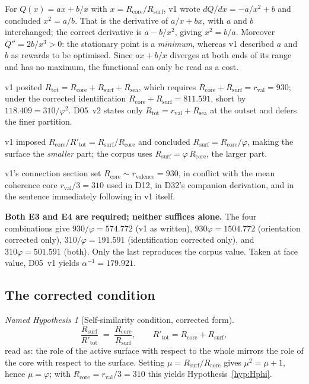 \documentclass[11pt,a4paper]{article}
\newcommand{\Rsea}{R_{\mathrm{sea}}}
\theoremstyle{plain}
\theoremstyle{definition}
\theoremstyle{remark}
\newtheorem{namedhyp}[theorem]{Named Hypothesis}
\newcommand{\rval}{r_{\mathrm{val}}}
\newcommand{\Rsurf}{R_{\mathrm{surf}}}
\newcommand{\Rtot}{R_{\mathrm{tot}}}
\begin{document}
\begin{description}[leftmargin=1.6cm, style=nextline]
\item[\textbf{E1 --- derivative.}] For $Q(x)=ax+b/x$ with $x=R_{\mathrm{core}}/\Rsurf$, v1 wrote $dQ/dx=-a/x^2+b$ and concluded $x^2=a/b$. That is the derivative of $a/x+bx$, with $a$ and $b$ interchanged; the correct derivative is $a-b/x^2$, giving $x^2=b/a$. Moreover $Q''=2b/x^3>0$: the stationary point is a \emph{minimum}, whereas v1 described $a$ and $b$ as rewards to be optimised. Since $ax+b/x$ diverges at both ends of its range and has no maximum, the functional can only be read as a cost.
\item[\textbf{E2 --- premature decomposition.}] v1 posited $\Rtot=R_{\mathrm{core}}+\Rsurf+\Rsea$, which requires $R_{\mathrm{core}}+\Rsurf=\rval=930$; under the corrected identification $R_{\mathrm{core}}+\Rsurf=811.591$, short by $118.409=310/\varphi^2$. D05~v2 states only $\Rtot=\rval+\Rsea$ at the outset and defers the finer partition.
\item[\textbf{E3 --- orientation of the golden section.}] v1 imposed $R_{\mathrm{core}}/R'_{\mathrm{tot}}=\Rsurf/R_{\mathrm{core}}$ and concluded $\Rsurf=R_{\mathrm{core}}/\varphi$, making the surface the \emph{smaller} part; the corpus uses $\Rsurf=\varphi\,R_{\mathrm{core}}$, the larger part.
\item[\textbf{E4 --- identification of $R_{\mathrm{core}}$.}] v1's connection section set $R_{\mathrm{core}}\sim r_{\mathrm{valence}}=930$, in conflict with the mean coherence core $\rval/3=310$ used in D12, in D32's companion derivation, and in the sentence immediately following in v1 itself.
\end{description}

\noindent\textbf{Both E3 and E4 are required; neither suffices alone.} The four combinations give $930/\varphi=574.772$ (v1 as written), $930\varphi=1504.772$ (orientation corrected only), $310/\varphi=191.591$ (identification corrected only), and $310\varphi=501.591$ (both). Only the last reproduces the corpus value. Taken at face value, D05~v1 yields $\alpha^{-1}=179.921$.

\subsection{The corrected condition}
\label{subsec:Hphicondition}
\begin{namedhyp}[Self-similarity condition, corrected form]
\label{hyp:selfsim}
\[
\frac{\Rsurf}{R'_{\mathrm{tot}}} \;=\; \frac{R_{\mathrm{core}}}{\Rsurf},
\qquad R'_{\mathrm{tot}} = R_{\mathrm{core}}+\Rsurf ,
\]
read as: the role of the active surface with respect to the whole mirrors the role of the core with respect to the surface. Setting $\mu=\Rsurf/R_{\mathrm{core}}$ gives $\mu^2=\mu+1$, hence $\mu=\varphi$; with $R_{\mathrm{core}}=\rval/3=310$ this yields Hypothesis~\ref{hyp:Hphi}.
\end{namedhyp}
\end{document}
